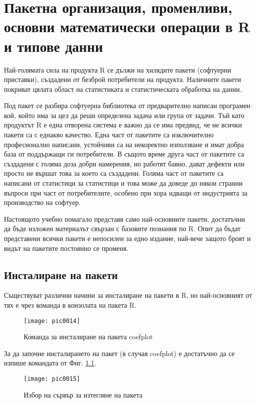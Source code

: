 \newpage
\chapter{Пакетна организация, променливи, основни математически операции в R и типове данни}
\label{chapter02}

Най-голямата сила на продукта R се дължи на хилядите пакети (софтуерни приставки), създадени от безброй потребители на продукта. Наличните пакети покриват цялата област на статистиката и статистическата обработка на данни. 

Под пакет се разбира софтуерна библиотека от предварително написан програмен кой, който има за цел да реши определена задача или група от задачи. Тъй като продуктът R е една отворена система е важно да се има предвид, че не всички пакети са с еднакво качество. Една част от пакетите са изключително професионално написани, устойчиви са на некоректно използване и имат добра база от поддържащи ги потребители. В същото време друга част от пакетите са създадени с голяма доза добри намерения, но работят бавно, дават дефекти или просто не вършат това за което са създадени. Голяма част от пакетите са написани от статистици за статистици и това може да доведе до някои странни въпроси при част от потребителите, особено при хора идващи от индустрията за производство на софтуер. 

Настоящото учебно помагало представя само най-основните пакети, достатъчни да бъде изложен материалът свързан с базовите познания по R. Опит да бъдат представени всички пакети е непосилен за едно издание, най-вече защото броят и видът на пакетите постоянно се променя. 

\section{Инсталиране на пакети}

Съществуват различни начини за инсталиране на пакети в R, но най-основният от тях е чрез команда в конзолата на пакета R. 

\begin{figure}[h!]
  \centering
  \texttt{[image: pic0014]}
  \caption{Команда за инсталиране на пакета coefplot}
\label{figure0014}
\end{figure}
\FloatBarrier

За да започне инсталирането на пакет (в случая coefplot) е достатъчно да се изпише командата от Фиг. \ref{figure0014}.

\begin{figure}[h!]
  \centering
  \texttt{[image: pic0015]}
  \caption{Избор на сървър за изтегляне на пакета}
\label{figure0015}
\end{figure}
\FloatBarrier

